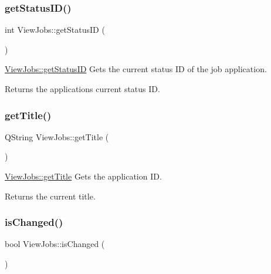 \subsubsection{\texorpdfstring{get\+Status\+I\+D()}{getStatusID()}}
{\footnotesize\ttfamily int View\+Jobs\+::get\+Status\+ID (\begin{DoxyParamCaption}{ }\end{DoxyParamCaption})}



\mbox{\hyperlink{class_view_jobs_a91696fde9f0a663bae929390aac8324b}{View\+Jobs\+::get\+Status\+ID}} Gets the current status ID of the job application. 

\begin{DoxyReturn}{Returns}
the application\textquotesingle{}s current status ID. 
\end{DoxyReturn}
\mbox{\label{class_view_jobs_ae78f119d37c77a9e3e457ecfd78d7de3}} 
\subsubsection{\texorpdfstring{get\+Title()}{getTitle()}}
{\footnotesize\ttfamily Q\+String View\+Jobs\+::get\+Title (\begin{DoxyParamCaption}{ }\end{DoxyParamCaption})}



\mbox{\hyperlink{class_view_jobs_ae78f119d37c77a9e3e457ecfd78d7de3}{View\+Jobs\+::get\+Title}} Gets the application ID. 

\begin{DoxyReturn}{Returns}
the current title. 
\end{DoxyReturn}
\mbox{\label{class_view_jobs_a5f75b45d28ce7f4a8050ce9ce0f44350}} 
\subsubsection{\texorpdfstring{is\+Changed()}{isChanged()}}
{\footnotesize\ttfamily bool View\+Jobs\+::is\+Changed (\begin{DoxyParamCaption}{ }\end{DoxyParamCaption})}



